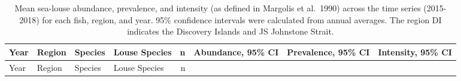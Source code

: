 \documentclass[fleqn,10pt]{wlpeerj} %
\begin{document}
\begin{longtable}[]{@{}llllrlll@{}}
\caption{\label{tab:sealice-table} Mean sea-louse abundance, prevalence, and intensity (as defined in Margolis et al.~1990) across the time series (2015-2018) for each fish, region, and year. 95\% confidence intervals were calculated from annual averages. The region DI indicates the Discovery Islands and JS Johnstone Strait.}\tabularnewline
\toprule
\begin{minipage}[b]{0.04\columnwidth}\raggedright
Year\strut
\end{minipage} & \begin{minipage}[b]{0.06\columnwidth}\raggedright
Region\strut
\end{minipage} & \begin{minipage}[b]{0.07\columnwidth}\raggedright
Species\strut
\end{minipage} & \begin{minipage}[b]{0.13\columnwidth}\raggedright
Louse Species\strut
\end{minipage} & \begin{minipage}[b]{0.03\columnwidth}\raggedleft
n\strut
\end{minipage} & \begin{minipage}[b]{0.15\columnwidth}\raggedright
Abundance, 95\% CI\strut
\end{minipage} & \begin{minipage}[b]{0.16\columnwidth}\raggedright
Prevalence, 95\% CI\strut
\end{minipage} & \begin{minipage}[b]{0.15\columnwidth}\raggedright
Intensity, 95\% CI\strut
\end{minipage}\tabularnewline
\midrule
\endfirsthead
\toprule
\begin{minipage}[b]{0.04\columnwidth}\raggedright
Year\strut
\end{minipage} & \begin{minipage}[b]{0.06\columnwidth}\raggedright
Region\strut
\end{minipage} & \begin{minipage}[b]{0.07\columnwidth}\raggedright
Species\strut
\end{minipage} & \begin{minipage}[b]{0.13\columnwidth}\raggedright
Louse Species\strut
\end{minipage} & \begin{minipage}[b]{0.03\columnwidth}\raggedleft
n\strut
\end{minipage} & \begin{minipage}[b]{0.15\columnwidth}\raggedright

\end{minipage}
\end{longtable}
\end{document}
